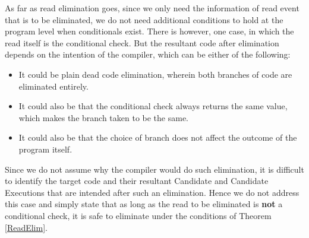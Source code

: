     As far as read elimination goes, since we only need the information of read event that is to be eliminated, we do not need additional conditions to hold at the program level when conditionals exist. 
    There is however, one case, in which the read itself is the conditional check. 
    But the resultant code after elimination depends on the intention of the compiler, which can be either of the following:
    \begin{itemize}
        \item It could be plain dead code elimination, wherein both branches of code are eliminated entirely. 
        \item It could also be that the conditional check always returns the same value, which makes the branch taken to be the same. 
        \item It could also be that the choice of branch does not affect the outcome of the program itself. 
    \end{itemize}
    
    Since we do not assume why the compiler would do such elimination, it is difficult to identify the target code and their resultant Candidate and Candidate Executions that are intended after such an elimination. 
    Hence we do not address this case and simply state that as long as the read to be eliminated is \textbf{not} a conditional check, it is safe to eliminate under the conditions of Theorem \ref{ReadElim}. 
    